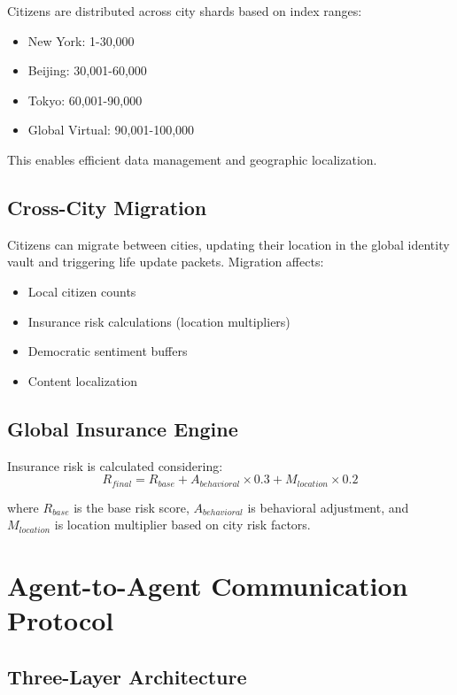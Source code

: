 \documentclass[12pt,a4paper]{article}
\begin{document}
\begin{itemize}
Citizens are distributed across city shards based on index ranges:
\begin{itemize}
    \item New York: 1-30,000
    \item Beijing: 30,001-60,000
    \item Tokyo: 60,001-90,000
    \item Global Virtual: 90,001-100,000
\end{itemize}

This enables efficient data management and geographic localization.

\subsection{Cross-City Migration}

Citizens can migrate between cities, updating their location in the global identity vault and triggering life update packets. Migration affects:
\begin{itemize}
    \item Local citizen counts
    \item Insurance risk calculations (location multipliers)
    \item Democratic sentiment buffers
    \item Content localization
\end{itemize}

\subsection{Global Insurance Engine}

Insurance risk is calculated considering:
\begin{equation}
R_{final} = R_{base} + A_{behavioral} \times 0.3 + M_{location} \times 0.2
\end{equation}

where $R_{base}$ is the base risk score, $A_{behavioral}$ is behavioral adjustment, and $M_{location}$ is location multiplier based on city risk factors.

\section{Agent-to-Agent Communication Protocol}

\subsection{Three-Layer Architecture}


\end{itemize}
\end{document}
